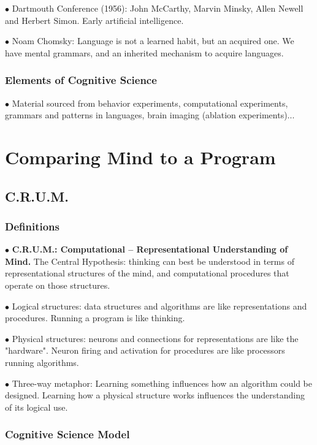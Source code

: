 \documentclass[english,openany]{book}
\begin{document}
$\bullet$ Dartmouth Conference (1956): John McCarthy, Marvin Minsky, Allen Newell and Herbert Simon. Early artificial intelligence.

$\bullet$ Noam Chomsky: Language is not a learned habit, but an acquired one. We have mental grammars, and an inherited mechanism to acquire languages.

\subsection{Elements of Cognitive Science}

$\bullet$ Material sourced from behavior experiments, computational experiments, grammars and patterns in languages, brain imaging (ablation experiments)...

\chapter{Comparing Mind to a Program}

\section{C.R.U.M.}

\subsection{Definitions}

$\bullet$ \textbf{C.R.U.M.: Computational -- Representational Understanding of Mind.} The Central Hypothesis: thinking can best be understood in terms of representational structures of the mind, and computational procedures that operate on those structures.

$\bullet$ Logical structures: data structures and algorithms are like representations and procedures. Running a program is like thinking.

$\bullet$ Physical structures: neurons and connections for representations are like the "hardware". Neuron firing and activation for procedures are like processors running algorithms.

$\bullet$ Three-way metaphor: Learning something influences how an algorithm could be designed. Learning how a physical structure works influences the understanding of its logical use.

\subsection{Cognitive Science Model}
\end{document}
